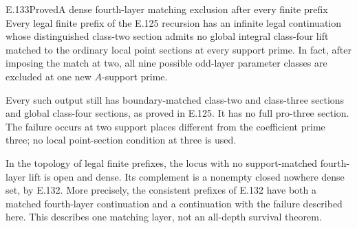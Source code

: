\begin{result}{E.133}{Proved}{A dense fourth-layer matching exclusion after every finite prefix}
Every legal finite prefix of the E.125 recursion has an
infinite legal continuation whose distinguished class-two
section admits no global integral class-four lift matched
to the ordinary local point sections at every support
prime. In fact, after imposing the match at two, all nine
possible odd-layer parameter classes are excluded at one
new $A$-support prime.

Every such output still has boundary-matched class-two
and class-three sections and global class-four sections,
as proved in E.125. It has no full pro-three section.
The failure occurs at two support places different from
the coefficient prime three; no local point-section
condition at three is used.

In the topology of legal finite prefixes, the locus with
no support-matched fourth-layer lift is open and dense.
Its complement is a nonempty closed nowhere dense set,
by E.132. More precisely, the consistent prefixes of
E.132 have both a matched fourth-layer continuation and
a continuation with the failure described here.
This describes one matching layer, not an all-depth
survival theorem.
\end{result}
